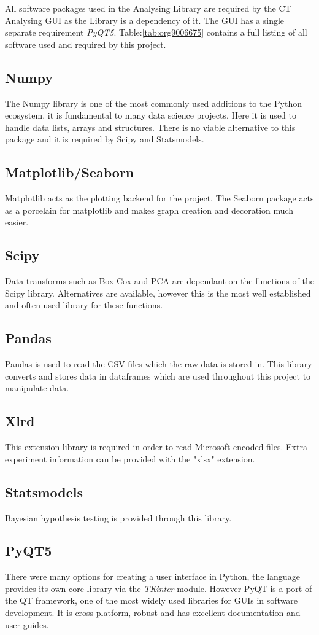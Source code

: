 \documentclass[11pt]{report}
\begin{document}
All software packages used in the Analysing Library are required by the CT Analysing GUI as the Library is a dependency of it. The GUI has a single separate requirement \emph{PyQT5}.
Table:\ref{tab:org9006675} contains a full listing of all software used and required by this project.
\subsection{Numpy}
\label{sec:orge1f7efb}
The Numpy library is one of the most commonly used additions to the Python ecosystem, it is fundamental to many data science projects. Here it is used to handle data lists, arrays and structures. There is no viable alternative to this package and it is required by Scipy and Statsmodels.
\subsection{Matplotlib/Seaborn}
\label{sec:org35efb23}
Matplotlib acts as the plotting backend for the project. The Seaborn package acts as a porcelain for matplotlib and makes graph creation and decoration much easier.
\subsection{Scipy}
\label{sec:orgd04fc78}
Data transforms such as Box Cox and PCA are dependant on the functions of the Scipy library. Alternatives are available, however this is the most well established and often used library for these functions.
\subsection{Pandas}
\label{sec:org4016ffc}
Pandas is used to read the CSV files which the raw data is stored in. This library converts and stores data in dataframes which are used throughout this project to manipulate data.
\subsection{Xlrd}
\label{sec:org0992ed5}
This extension library is required in order to read Microsoft encoded files. Extra experiment information can be provided with the "xlsx" extension.
\subsection{Statsmodels}
\label{sec:org7bc387a}
Bayesian hypothesis testing is provided through this library.
\subsection{PyQT5}
\label{sec:org98f4991}
There were many options for creating a user interface in Python, the language provides its own core library via the \emph{TKinter} module. However PyQT is a port of the QT framework, one of the most widely used libraries for GUIs in software development. It is cross platform, robust and has excellent documentation and user-guides.
\end{document}
